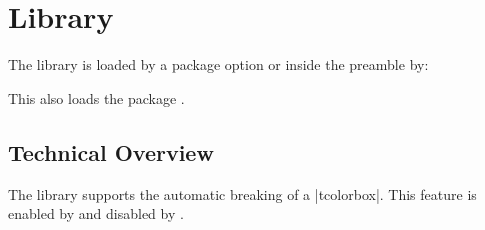 \clearpage
\section{Library }\label{sec:breakable}%
%
The library is loaded by a package option or inside the preamble by:
\begin{dispListing}
\end{dispListing}
This also loads the package .

\subsection{Technical Overview}
The library  supports the automatic breaking of a |tcolorbox|.
This feature is enabled by 
and disabled by .

